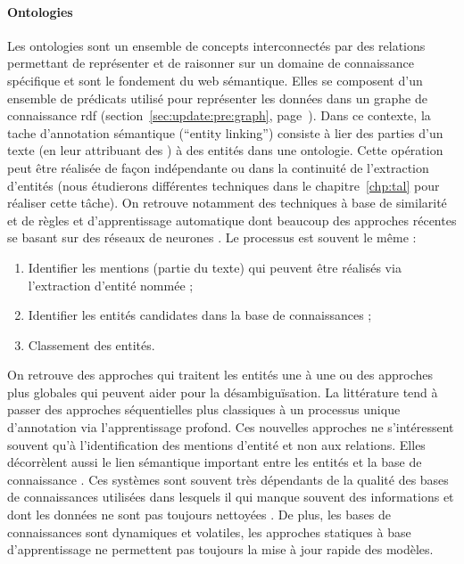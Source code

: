 \paragraph{Ontologies}
Les ontologies sont un ensemble de concepts interconnectés par des relations permettant de représenter et de raisonner sur un domaine de connaissance spécifique et sont le fondement du web sémantique.
Elles se composent d'un ensemble de prédicats utilisé pour représenter les données dans un graphe de connaissance \acrshort{rdf} (section~\ref{sec:update:pre:graph}, page~\pageref{sec:update:pre:graph}).
Dans ce contexte, la tache d'annotation sémantique (\enquote{entity linking}) consiste à lier des parties d'un texte (en leur attribuant des ) à des entités dans une ontologie.
Cette opération peut être réalisée de façon indépendante ou dans la continuité de l'extraction d'entités \cite{al-moslmiNamedEntityExtraction2020} (nous étudierons différentes techniques dans le chapitre~\ref{chp:tal} pour réaliser cette tâche).
On retrouve notamment des techniques à base de similarité et de règles \cite{liuDBpediaBasedEntityLinking2018,amaviNaturalLanguageQuerying2020} et d'apprentissage automatique \cite{shenProbabilisticModelLinking2014,fanLinkingEntitiesRelations2024} dont beaucoup des approches récentes se basant sur des réseaux de neurones \cite{mondalMedicalEntityLinking2019,sakorFalconEntityRelation2020,liEfficientOnePassEndtoEnd2020,bellatrecheNewTrendsDatabase2021,navigliWordSenseDisambiguation2024}.
Le processus est souvent le même :
\begin{enumerate}
    \item Identifier les mentions (partie du texte) qui peuvent être réalisés via l'extraction d'entité nommée ;
    \item Identifier les entités candidates dans la base de connaissances ;
    \item Classement des entités.
\end{enumerate}
On retrouve des approches qui traitent les entités une à une ou des approches plus globales qui peuvent aider pour la désambiguïsation.
La littérature tend à passer des approches séquentielles plus classiques à un processus unique d'annotation via l'apprentissage profond.
Ces nouvelles approches ne s'intéressent souvent qu'à l'identification des mentions d'entité et non aux relations.
Elles décorrèlent aussi le lien sémantique important entre les entités et la base de connaissance \cite{huEntityLinkingSymmetrical2019}.
Ces systèmes sont souvent très dépendants de la qualité des bases de connaissances utilisées dans lesquels il qui manque souvent des informations et dont les données ne sont pas toujours nettoyées \cite{weichselbraunMiningLeveragingBackground2018}.
De plus, les bases de connaissances sont dynamiques et volatiles, les approches statiques à base d'apprentissage ne permettent pas toujours la mise à jour rapide des modèles.

